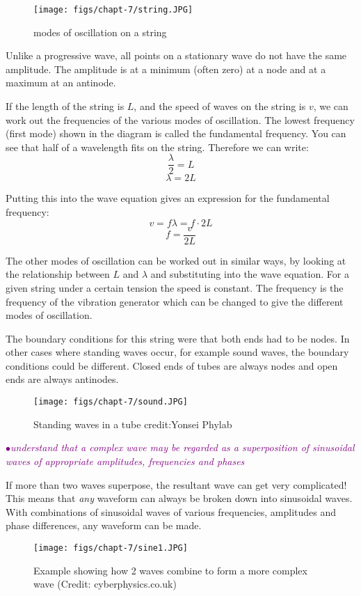 \documentclass[a4paper,11pt,twoside]{memoir}
\newcounter{spec}[chapter]
\newcommand{\spec}[1]{\Needspace{5\baselineskip}\textcolor{purple}{$\bullet$\hspace{0.5cm}\textit{#1}}}
\begin{document}
\begin{figure}[h!]
\centering
\texttt{[image: figs/chapt-7/string.JPG]}
\caption{modes of oscillation on a string}
\end{figure}

Unlike a progressive wave, all points on a stationary wave do not have the same amplitude. The amplitude is at a minimum (often zero) at a node and at a maximum at an antinode.

If the length of the string is $L$, and the speed of waves on the string is $v$, we can work out the frequencies of the various modes of oscillation. The lowest frequency (first mode) shown in the diagram is called the fundamental frequency. You can see that half of a wavelength fits on the string. Therefore we can write:
$$\frac{\lambda}{2} = L$$
$$\lambda = 2L$$

Putting this into the wave equation gives an expression for the fundamental frequency:
$$v = f\lambda = f\cdot 2L$$
$$f = \frac{v}{2L}$$

The other modes of oscillation can be worked out in similar ways, by looking at the relationship between $L$ and $\lambda$ and substituting into the wave equation. For a given string under a certain tension the speed is constant. The frequency is the frequency of the vibration generator which can be changed to give the different modes of oscillation.

The boundary conditions for this string were that both ends had to be nodes. In other cases where standing waves occur, for example sound waves, the boundary conditions could be different. Closed ends of tubes are always nodes and open ends are always antinodes.

\begin{figure}[h!]
\centering
\texttt{[image: figs/chapt-7/sound.JPG]}
\caption{Standing waves in a tube {credit:Yonsei Phylab}}
\end{figure}

\spec{understand that a complex wave may be regarded as a superposition of sinusoidal waves of appropriate amplitudes, frequencies and phases}

If more than two waves superpose, the resultant wave can get very complicated! This means that \emph{any} waveform can always be broken down into sinusoidal waves. With combinations of sinusoidal waves of various frequencies, amplitudes and phase differences, any waveform can be made.

\begin{figure}[h!]
\centering
\texttt{[image: figs/chapt-7/sine1.JPG]}
\caption{Example showing how 2 waves combine to form a more complex wave (Credit: cyberphysics.co.uk)}
\end{figure}
\end{document}
